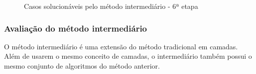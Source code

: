 \begin{figure}[!htb]
    \centering
    \quad %
    \quad %
    \quad %
    \quad %
\caption{Casos solucionáveis pelo método intermediário - 6ª etapa}
\label{fig:intermediario6}
\end{figure}


\subsubsection{Avaliação do método intermediário}


O método intermediário é uma extensão do método tradicional em camadas. Além de usarem o mesmo conceito de camadas, o intermediário também possui o mesmo conjunto de algoritmos do método anterior.

